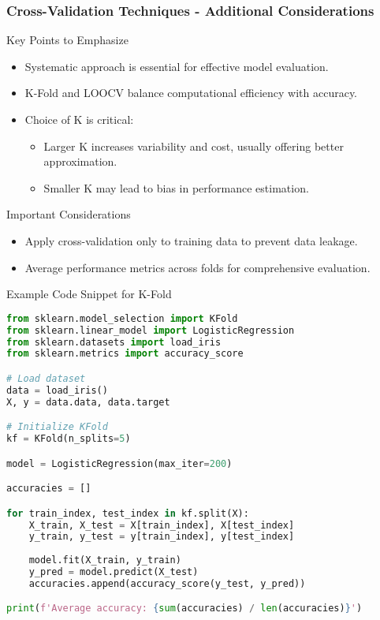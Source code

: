 \documentclass[aspectratio=169]{beamer}
\begin{document}
\begin{frame}[fragile]
    \frametitle{Cross-Validation Techniques - Additional Considerations}
    \begin{block}{Key Points to Emphasize}
        \begin{itemize}
            \item Systematic approach is essential for effective model evaluation.
            \item K-Fold and LOOCV balance computational efficiency with accuracy.
            \item Choice of K is critical:
                \begin{itemize}
                    \item Larger K increases variability and cost, usually offering better approximation.
                    \item Smaller K may lead to bias in performance estimation.
                \end{itemize}
        \end{itemize}
    \end{block}

    \begin{block}{Important Considerations}
        \begin{itemize}
            \item Apply cross-validation only to training data to prevent data leakage.
            \item Average performance metrics across folds for comprehensive evaluation.
        \end{itemize}
    \end{block}

    \begin{block}{Example Code Snippet for K-Fold}
        \begin{lstlisting}[language=Python]
from sklearn.model_selection import KFold
from sklearn.linear_model import LogisticRegression
from sklearn.datasets import load_iris
from sklearn.metrics import accuracy_score

# Load dataset
data = load_iris()
X, y = data.data, data.target

# Initialize KFold
kf = KFold(n_splits=5)

model = LogisticRegression(max_iter=200)

accuracies = []

for train_index, test_index in kf.split(X):
    X_train, X_test = X[train_index], X[test_index]
    y_train, y_test = y[train_index], y[test_index]
    
    model.fit(X_train, y_train)
    y_pred = model.predict(X_test)
    accuracies.append(accuracy_score(y_test, y_pred))

print(f'Average accuracy: {sum(accuracies) / len(accuracies)}')
        \end{lstlisting}
    \end{block}
\end{frame}
\end{document}
